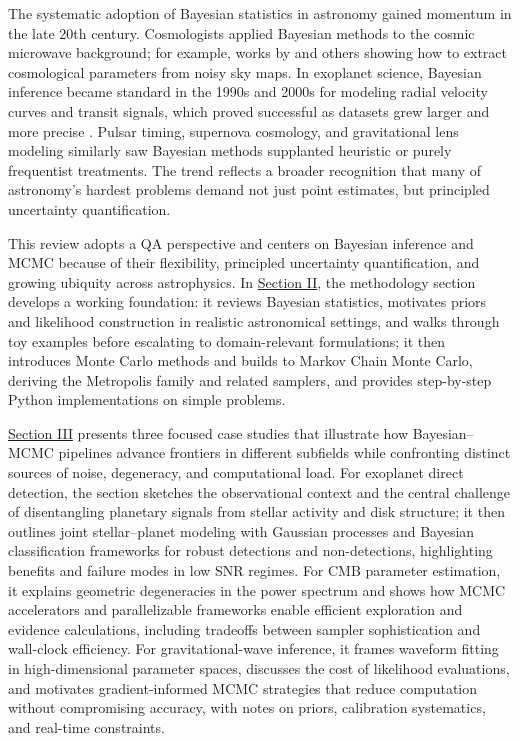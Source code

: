 \documentclass[preprint,longauthor]{aastex631}
\numberwithin{equation}{section}
\begin{document}
The systematic adoption of Bayesian statistics in astronomy gained momentum in the late 20th century. Cosmologists applied Bayesian methods to the cosmic microwave background; for example, works by \citet{tegmarkKarhunenLoeveEigenvalueProblems1997} and others showing how to extract cosmological parameters from noisy sky maps. In exoplanet science, Bayesian inference became standard in the 1990s and 2000s for modeling radial velocity curves and transit signals, which proved successful as datasets grew larger and more precise \citep{gregoryBayesianAnalysisExtrasolar2005}. Pulsar timing, supernova cosmology, and gravitational lens modeling similarly saw Bayesian methods supplanted heuristic or purely frequentist treatments. The trend reflects a broader recognition that many of astronomy’s hardest problems demand not just point estimates, but principled uncertainty quantification.

This review adopts a QA perspective and centers on Bayesian inference and MCMC because of their flexibility, principled uncertainty quantification, and growing ubiquity across astrophysics. In \hyperref[sec:Methodology]{Section II}, the methodology section develops a working foundation: it reviews Bayesian statistics, motivates priors and likelihood construction in realistic astronomical settings, and walks through toy examples before escalating to domain-relevant formulations; it then introduces Monte Carlo methods and builds to Markov Chain Monte Carlo, deriving the Metropolis family and related samplers, and provides step-by-step Python implementations on simple problems.

\hyperref[placeholder]{Section III} presents three focused case studies that illustrate how Bayesian–MCMC pipelines advance frontiers in different subfields while confronting distinct sources of noise, degeneracy, and computational load. For exoplanet direct detection, the section sketches the observational context and the central challenge of disentangling planetary signals from stellar activity and disk structure; it then outlines joint stellar–planet modeling with Gaussian processes and Bayesian classification frameworks for robust detections and non-detections, highlighting benefits and failure modes in low SNR regimes. For CMB parameter estimation, it explains geometric degeneracies in the power spectrum and shows how MCMC accelerators and parallelizable frameworks enable efficient exploration and evidence calculations, including tradeoffs between sampler sophistication and wall-clock efficiency. For gravitational-wave inference, it frames waveform fitting in high-dimensional parameter spaces, discusses the cost of likelihood evaluations, and motivates gradient-informed MCMC strategies that reduce computation without compromising accuracy, with notes on priors, calibration systematics, and real-time constraints.
\end{document}
